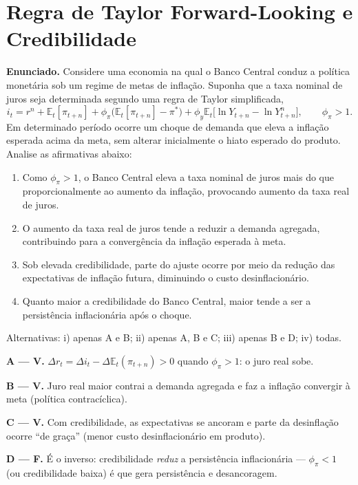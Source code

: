 \documentclass[12pt, a4paper]{article}
\newcommand{\E}{\mathbb{E}}
\begin{document}
\section{Regra de Taylor Forward-Looking e Credibilidade}

\textbf{Enunciado.} Considere uma economia na qual o Banco Central conduz a
política monetária sob um regime de metas de inflação. Suponha que a taxa
nominal de juros seja determinada segundo uma regra de Taylor simplificada,
\[
i_t = r^n + \E_t[\pi_{t+n}] + \phi_\pi\bigl(\E_t[\pi_{t+n}] - \pi^*\bigr)
+ \phi_y \E_t\bigl[\ln Y_{t+n} - \ln Y^n_{t+n}\bigr],
\qquad \phi_\pi > 1.
\]
Em determinado período ocorre um choque de demanda que eleva a inflação
esperada acima da meta, sem alterar inicialmente o hiato esperado do produto.
Analise as afirmativas abaixo:

\begin{enumerate}[label=\Alph*.]
\item Como $\phi_\pi > 1$, o Banco Central eleva a taxa nominal de juros mais
do que proporcionalmente ao aumento da inflação, provocando aumento da taxa
real de juros.
\item O aumento da taxa real de juros tende a reduzir a demanda agregada,
contribuindo para a convergência da inflação esperada à meta.
\item Sob elevada credibilidade, parte do ajuste ocorre por meio da redução
das expectativas de inflação futura, diminuindo o custo desinflacionário.
\item Quanto maior a credibilidade do Banco Central, maior tende a ser a
persistência inflacionária após o choque.
\end{enumerate}
Alternativas: i) apenas A e B; ii) apenas A, B e C; iii) apenas B e D;
iv) todas.

\begin{correctbox}[title={Resposta: ii) Apenas A, B e C --- Princípio de Taylor (chave da Lista 3, Q6)}]
\textbf{A --- V.} $\Delta r_t = \Delta i_t - \Delta\E_t(\pi_{t+n}) > 0$ quando
$\phi_\pi > 1$: o juro real sobe.

\textbf{B --- V.} Juro real maior contrai a demanda agregada e faz a inflação
convergir à meta (política contracíclica).

\textbf{C --- V.} Com credibilidade, as expectativas se ancoram e parte da
desinflação ocorre ``de graça'' (menor custo desinflacionário em produto).

\textbf{D --- F.} É o inverso: credibilidade \emph{reduz} a persistência
inflacionária --- $\phi_\pi < 1$ (ou credibilidade baixa) é que gera
persistência e desancoragem.
\end{correctbox}
\end{document}
